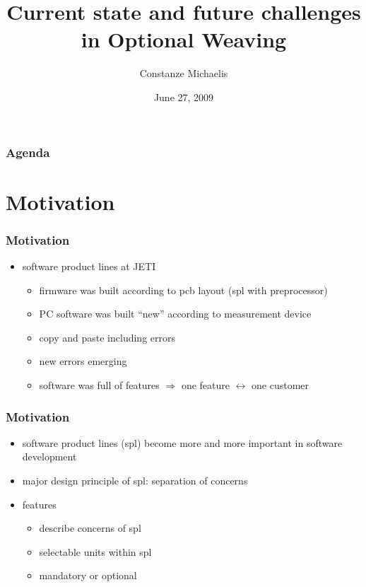\documentclass{beamer}
\title{Current state and future challenges in Optional Weaving}
\author{Constanze Michaelis}
\date{June 27, 2009}
\institute{Student Conference on Software Engineering and Database Systems}
\begin{document}
\begin{frame}[plain]
 \titlepage
\end{frame}



\section[Agenda]{}
\begin{frame}
\frametitle{Agenda}
\tableofcontents
\end{frame}

\section{Motivation}
\begin{frame}
\frametitle{Motivation}
\begin{itemize}
 \item software product lines at JETI
\begin{itemize}
	\item firmware was built according to pcb layout (spl with preprocessor)
	\item PC software was built ``new'' according to measurement device
	\item copy and paste including errors
	\item new errors emerging
	\item software was full of features $\Rightarrow$ one feature $\leftrightarrow$ one customer	
\end{itemize}
\end{itemize}
\end{frame}

\begin{frame}
\frametitle{Motivation}
\begin{itemize}
 \item software product lines (spl) become more and more important in software development
 \item major design principle of spl: separation of concerns 
 \item features 
	\begin{itemize}
	  \item describe concerns of spl
	  \item selectable units within spl
	  \item mandatory or optional
	\end{itemize}
 
\end{itemize}
\end{frame}
\end{document}

